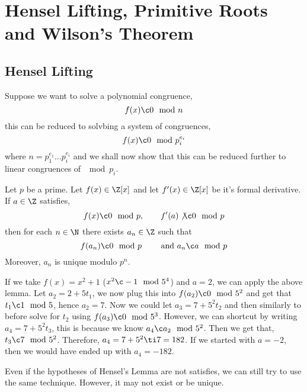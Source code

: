 
\section{Hensel Lifting, Primitive Roots and Wilson's Theorem}
\subsection{Hensel Lifting}
Suppose we want to solve a polynomial congruence,
$$ f(x) \c 0 \mod n $$
this can be reduced to solvbing a system of congruences,
$$ f(x) \c 0 \mod p_i^{e_i} $$
where $n= p_1^{e_1}\dots p_i^{e_i}$ and we shall now show that this can be reduced further to linear congruences of $\mod p_i$.

\begin{nthm}
  Let $p$ be a prime. Let $f(x) \in \Z[x]$ and let $f'(x) \in \Z[x]$ be it's formal derivative. If $a \in \Z$ satisfies,
  $$ f(x) \c 0\mod p, \qquad f'(a) \not\c 0 \mod p $$
  then for each $n \in \N$ there exists $a_n \in \Z$ such that
  $$ f(a_n) \c 0 \mod p \qquad \text{ and } a_n \c a \mod p $$
  Moreover, $a_n$ is unique modulo $p^n$.
\end{nthm}

If we take $f(x) = x^2 + 1$ ($x^2 \c -1 \mod 5^4$) and $a = 2$, we can apply the above lemma. Let $a_2 = 2 + 5t_1$, we now plug this into $f(a_2) \c 0 \mod 5^2$ and get that $t_1 \c 1 \mod 5$, hence $a_2 = 7$. Now we could let $a_3 = 7 + 5^2t_2$ and then similarly to before solve for $t_2$ using
$f(a_3) \c 0 \mod 5^3$. However, we can shortcut by writing $a_4 = 7 + 5^2t_3$, this is because we know $a_4 \c a_2 \mod 5^2$. Then we get that, $t_3 \c 7 \mod 5^2$. Therefore, $a_4 = 7 + 5^2 \ti 7 = 182$. If we started with $a = -2$, then we would have ended up with $a_4 = -182$.

\begin{remark}
  Even if the hypotheses of Hensel's Lemma are not satisfies, we can still try to use the same technique. However, it may not exist or be unique.
\end{remark}

